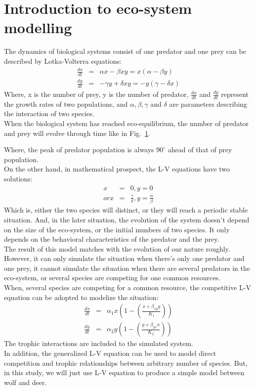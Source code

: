 \documentclass[a4paper,12pt]{article}
\begin{document}
\section{Introduction to eco-system modelling}
The dynamics of biological systems consist of one predator and one prey can be described by Lotka-Volterra equations:
\begin{eqnarray*}
\frac{dx}{dt} &=& \alpha x - \beta x y = x(\alpha - \beta y) \\
\frac{dy}{dt} &=& - \gamma y + \delta x y = - y (\gamma - \delta x)
\end{eqnarray*}
Where, x is the number of prey, y is the number of predator, $\frac{dx}{dt}$ and $\frac{dy}{dt}$ represent the growth rates of two populations, and $\alpha, \beta, \gamma$ and $\delta$ are parameters describing the interaction of two species. \\
When the biological system has reached eco-equilibrium, the number of predator and prey will evolve through time like in Fig.~\ref{Fig:evolution}.
\begin{figure}[!htb]
  \centering
  \caption{}\label{Fig:evolution}
\end{figure}
Where, the peak of predator population is always $90^{\circ}$ ahead of that of prey population. \\
On the other hand, in mathematical prospect, the L-V equations have two solutions:
\begin{eqnarray*}
x &=& 0, y = 0 \\
or x &=& \frac{\gamma}{\delta}, y = \frac{\alpha}{\beta}
\end{eqnarray*}
Which is, either the two species will distinct, or they will reach a periodic stable situation. And, in the later situation, the evolution of the system doesn't depend on the size of the eco-system, or the initial numbers of two species. It only depends on the behavioral characteristics of the predator and the prey. \\
The result of this model matches with the evolution of our nature roughly. However, it can only simulate the situation when there's only one predator and one prey, it cannot simulate the situation when there are several predators in the eco-system, or several species are competing for one common resources. \\
When, several species are competing for a common resource, the competitive L-V equation can be adopted to modelize the situation:
\begin{eqnarray*}
\frac{dx}{dt} &=& \alpha_1 x (1- (\frac{x + \beta_{xy} y}{K_1})) \\
\frac{dy}{dt} &=& \alpha_2 y (1 - (\frac{y + \beta_{yx} x}{K_2}))
\end{eqnarray*}
The trophic interactions are included to the simulated system. \\
In addition, the generalized L-V equation can be used to model direct competition and trophic relationships between arbitrary number of species. But, in this study, we will just use L-V equation to produce a simple model between wolf and deer. \\
\end{document}
